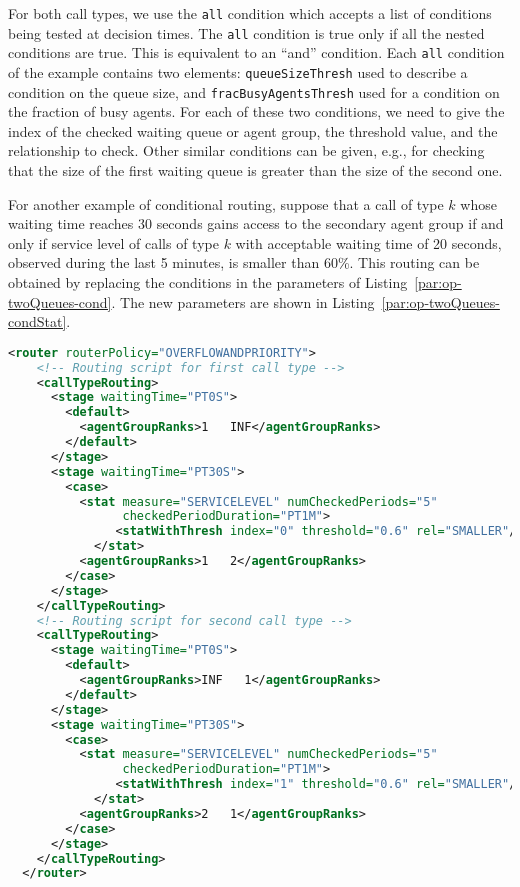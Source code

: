 For both call types, we use the \texttt{all} condition which accepts
a list of conditions being tested at decision times.  The \texttt{all}
condition is true only if all the nested conditions are true.
This is equivalent to an ``and'' condition.
Each \texttt{all} condition of the example contains two elements:
\texttt{queue\-Size\-Thresh} used to describe a
condition on the queue size, and
\texttt{frac\-Busy\-Agents\-Thresh} used for a condition on the
fraction of busy agents.
For each of these two conditions, we need to give the index of the
checked waiting queue or agent group, the threshold value, and the
relationship to check.
Other similar conditions can be given, e.g., for checking that the size
of the first waiting queue is greater than the size of the second one.

For another example of conditional routing, suppose that
a call of type $k$ whose waiting time reaches 30 seconds gains access to the
secondary agent group if and only if service level of calls of type
$k$ with acceptable waiting time of 20 seconds, observed during the
last 5 minutes, is smaller than 60\%.
This routing can be obtained by replacing the conditions in the
parameters
of Listing~\ref{par:op-twoQueues-cond}.
The new parameters are shown in
Listing~\ref{par:op-twoQueues-condStat}.

\begin{lstlisting}[caption={Part of
    \texttt{op-twoQueues-condStat.xml}: example of parameters for
    conditional routing depending on the service level observed during
  the last 5 minutes}, language=XML, label=par:op-twoQueues-condStat]
  <router routerPolicy="OVERFLOWANDPRIORITY">
    <!-- Routing script for first call type -->
    <callTypeRouting>
      <stage waitingTime="PT0S">
        <default>
          <agentGroupRanks>1   INF</agentGroupRanks>
        </default>
      </stage>
      <stage waitingTime="PT30S">
        <case>
          <stat measure="SERVICELEVEL" numCheckedPeriods="5"
                checkedPeriodDuration="PT1M">
               <statWithThresh index="0" threshold="0.6" rel="SMALLER"/>
            </stat>
          <agentGroupRanks>1   2</agentGroupRanks>
        </case>
      </stage>
    </callTypeRouting>
    <!-- Routing script for second call type -->
    <callTypeRouting>
      <stage waitingTime="PT0S">
        <default>
          <agentGroupRanks>INF   1</agentGroupRanks>
        </default>
      </stage>
      <stage waitingTime="PT30S">
        <case>
          <stat measure="SERVICELEVEL" numCheckedPeriods="5"
                checkedPeriodDuration="PT1M">
               <statWithThresh index="1" threshold="0.6" rel="SMALLER"/>
            </stat>
          <agentGroupRanks>2   1</agentGroupRanks>
        </case>
      </stage>
    </callTypeRouting>
  </router>
\end{lstlisting}

